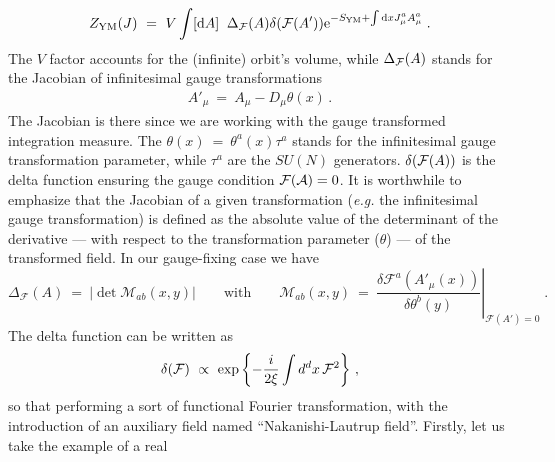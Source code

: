 \begin{eqnarray}
Z_{\mathrm{YM}}(J) ~=~ V\int [\mathrm{d} A] \;\; \Delta_{\cal F}(A) \delta({\cal F}(A')) \mathrm{e}^{-S_{\text{YM}} + \int {\rm d} x J_\mu^a A_\mu^a}\;.
\label{genfp}
\end{eqnarray}
The $V$ factor accounts for the (infinite) orbit's volume, while $\Delta_{\cal F}(A)$ stands for the Jacobian of infinitesimal gauge transformations 
\begin{eqnarray}
A'_{\mu} ~=~ A_{\mu} - D_{\mu}\theta(x) \,.
\label{inftgaugetransf}
\end{eqnarray}
The Jacobian is there since we are working with the gauge transformed integration measure. The
$\theta(x) ~=~ \theta^{a}(x)\tau^{a}$ stands for the infinitesimal gauge transformation
parameter, while $\tau^{a}$ are the $SU(N)$ generators.  $\delta({\cal F}(A))$ is the delta
function ensuring the gauge condition ${\cal F(A)}=0$. It is worthwhile to emphasize that the
Jacobian of a given transformation ({\it e.g.} the infinitesimal gauge transformation) is
defined as the absolute value of the determinant of the derivative --- with respect to the
transformation parameter ($\theta$) ---  of the transformed field. In our gauge-fixing case we
have
\begin{equation}
\Delta_{\mathcal F} (A) ~=~  |\det \mathcal  M_{ab} (x,y) | \qquad \text{with} \qquad  \mathcal
M_{ab} (x,y) ~=~ \left. \frac{\delta \mathcal F^a (A'_\mu (x))  }{\delta \theta^b(y)}
\right|_{\mathcal F(A') =0} \;.
\label{absvalue}
\end{equation}
The delta function can be written as
\begin{eqnarray}
\delta({\cal F}) ~\propto~ \exp\left\{-\frac{i}{2\xi}\int d^{d}x\,{\cal F}^{2}\right\} \,,
\end{eqnarray}
so that performing a sort of functional Fourier transformation, with the introduction of an
auxiliary field named ``Nakanishi-Lautrup field''. Firstly, let us take the example of a real
